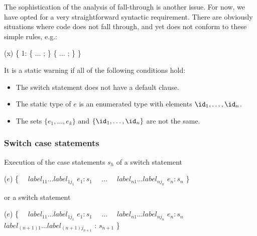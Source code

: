 \documentclass[makeidx]{article}
\begin{document}
{{  The sophistication of the analysis of fall-through is another issue.
  For now, we have opted for a very straightforward syntactic requirement.
  There are obviously situations where code does not fall through,
  and yet does not conform to these simple rules, e.g.:%
}

\begin{dartCode}
\SWITCH{} (x) \{
  \CASE{} 1: \TRY{} \{ $\ldots$ \RETURN; \} \FINALLY{} \{ $\ldots$ \RETURN; \}
\}
\end{dartCode}


\LMHash{}%
It is a static warning if all of the following conditions hold:

\begin{itemize}
\item The switch statement does not have a default clause.
\item The static type of $e$ is an enumerated
  type with elements $\id_1, \ldots, \id_n$.
\item The sets $\{e_1, \ldots, e_k\} $ and $\{\id_1, \ldots, \id_n\}$
  are not the same.
\end{itemize}



\subsubsection{Switch case statements}

\LMHash{}%
Execution of the case statements $s_h$ of a switch statement

\begin{normativeDartCode}
\SWITCH{} ($e$) \{
\ \ $label_{11} \ldots label_{1j_1}$ \CASE{} $e_1: s_1$
\ \ $\ldots$
\ \ $label_{n1} \ldots label_{nj_n}$ \CASE{} $e_n: s_n$
\}
\end{normativeDartCode}

\noindent
or a switch statement

\begin{normativeDartCode}
\SWITCH{} ($e$) \{
\ \ $label_{11} \ldots label_{1j_1}$ \CASE{} $e_1: s_1$
\ \ $\ldots$
\ \ $label_{n1} \ldots label_{nj_n}$ \CASE{} $e_n: s_n$
\ \ $label_{(n+1)1} \ldots label_{(n+1)j_{n+1}}$ \DEFAULT{}: $s_{n+1}$
\}
\end{normativeDartCode}

}
\end{document}

